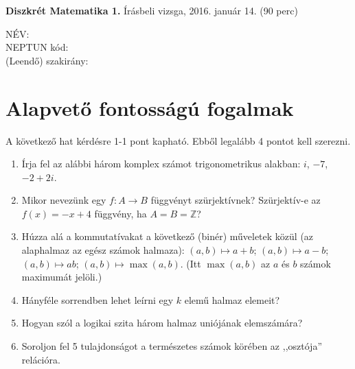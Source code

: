 \documentclass[11pt,a4paper]{article}
\begin{document}
\thispagestyle{empty}

\begin{center}
\begin{large}
\noindent \textbf{Diszkrét Matematika 1.} Írásbeli vizsga, 2016. január 14. (90 perc)
\end{large}
\end{center}

{\noindent NÉV: \\ NEPTUN kód:\\ (Leendő) szakirány:\\}
\section{Alapvető fontosságú fogalmak}
A következő hat kérdésre 1-1 pont kapható. Ebből legalább 4 pontot kell szerezni.
\begin{enumerate}\setlength{\itemsep}{3cm}

\item Írja fel az alábbi három komplex számot trigonometrikus alakban: $i$, $-7$, $-2+2i$.

\item Mikor nevezünk egy $f:A\to B$ függvényt szürjektívnek? Szürjektív-e az $f(x) = -x+4$ függvény, ha $A=B=\mathbb{Z}$?

\item Húzza alá a kommutatívakat a következő (binér) műveletek közül (az alaphalmaz az egész számok halmaza): $(a,b)\mapsto a+b$; $(a,b)\mapsto a-b$; $(a,b)\mapsto ab$; $(a,b)\mapsto \max(a,b)$. (Itt $\max(a,b)$ az $a$ és $b$ számok maximumát jelöli.)\vspace{-1.2cm}

\item Hányféle sorrendben lehet leírni egy $k$ elemű halmaz elemeit?\vspace{-1cm}

\item Hogyan szól a logikai szita három halmaz uniójának elemszámára?

\item Soroljon fel 5 tulajdonságot a természetes számok körében az ,,osztója'' relációra.
\end{enumerate}

\newpage
\end{document}

